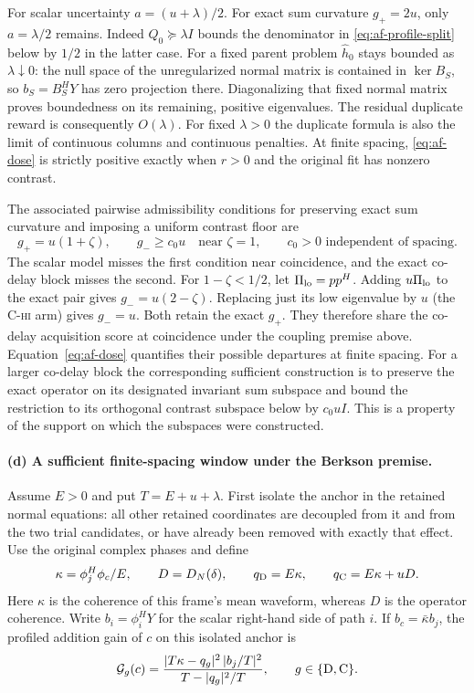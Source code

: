 For scalar uncertainty $a=(u+\lambda)/2$. For exact sum curvature
$g_+=2u$, only $a=\lambda/2$ remains. Indeed
$Q_0\succeq\lambda I$ bounds the denominator in
\eqref{eq:af-profile-split} below by $1/2$ in the latter case. For a fixed
parent problem $\hat h_0$ stays bounded as $\lambda\downarrow0$: the null
space of the unregularized normal matrix is contained in $\ker B_S$,
so $b_S=B_S^HY$ has zero projection there. Diagonalizing that fixed
normal matrix proves boundedness on its remaining, positive eigenvalues.
The residual duplicate reward is consequently $O(\lambda)$.
For fixed $\lambda>0$ the duplicate formula is also the limit of
continuous columns and continuous penalties. At finite spacing,
\eqref{eq:af-dose} is strictly positive exactly when $r>0$ and the
original fit has nonzero contrast.

The associated pairwise admissibility conditions for preserving exact
sum curvature and imposing a uniform contrast floor are
\[
 g_+=u(1+\zeta),\qquad g_-\ge c_0u
 \quad\text{near }\zeta=1,\qquad c_0>0
 \text{ independent of spacing}.
\]
The scalar model misses the first condition near coincidence, and the
exact co-delay block misses the second. For $1-\zeta<1/2$, let
$\Pi_{\rm lo}=pp^H$. Adding $u\Pi_{\rm lo}$ to the exact pair gives
$g_-=u(2-\zeta)$. Replacing just its low eigenvalue by $u$
(the \textsc{C-hi} arm) gives $g_-=u$. Both retain the exact $g_+$.
They therefore share the co-delay acquisition score at coincidence
under the coupling premise above. Equation~\eqref{eq:af-dose}
quantifies their possible departures at finite spacing. For a larger
co-delay block the corresponding sufficient construction is to preserve
the exact operator on its designated invariant sum subspace and bound
the restriction to its orthogonal contrast subspace below by $c_0uI$.
This is a property of the support on which the subspaces were constructed.

\paragraph{(d) A sufficient finite-spacing window under the Berkson premise.}
Assume $E>0$ and put $T=E+u+\lambda$. First isolate the anchor in the
retained normal equations: all other retained coordinates are decoupled
from it and from the two trial candidates, or have already been removed
with exactly that effect. Use the original complex phases and define
\[
 \kappa=\phi_j^H\phi_c/E,\qquad D=D_N(\delta),\qquad
 q_{\rm D}=E\kappa,\qquad q_{\rm C}=E\kappa+uD .
\]
Here $\kappa$ is the coherence of this frame's mean waveform, whereas
$D$ is the operator coherence. Write $b_i=\phi_i^HY$ for the scalar
right-hand side of path $i$. If $b_c=\bar\kappa b_j$, the profiled
addition gain of $c$ on this isolated anchor is
\begin{equation}
 \mathcal G_g(c)
 =\frac{|T\kappa-q_g|^2\,|b_j/T|^2}{T-|q_g|^2/T},
 \qquad g\in\{{\rm D},{\rm C}\}.                         \label{eq:af-admission}
\end{equation}


